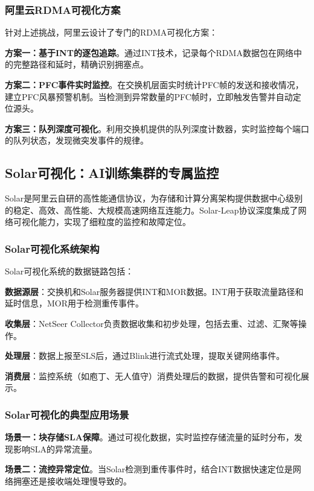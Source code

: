 \subsubsection{阿里云RDMA可视化方案}

针对上述挑战，阿里云设计了专门的RDMA可视化方案：

\textbf{方案一：基于INT的逐包追踪}。通过INT技术，记录每个RDMA数据包在网络中的完整路径和延时，精确识别拥塞点。

\textbf{方案二：PFC事件实时监控}。在交换机层面实时统计PFC帧的发送和接收情况，建立PFC风暴预警机制。当检测到异常数量的PFC帧时，立即触发告警并自动定位源头。

\textbf{方案三：队列深度可视化}。利用交换机提供的队列深度计数器，实时监控每个端口的队列状态，发现微突发事件的规律。

\subsection{Solar可视化：AI训练集群的专属监控}

Solar是阿里云自研的高性能通信协议，为存储和计算分离架构提供数据中心级别的稳定、高效、高性能、大规模高速网络互连能力。Solar-Leap协议深度集成了网络可视化能力，实现了细粒度的监控和故障定位。

\subsubsection{Solar可视化系统架构}

Solar可视化系统的数据链路包括：

\textbf{数据源层}：交换机和Solar服务器提供INT和MOR数据。INT用于获取流量路径和延时信息，MOR用于检测重传事件。

\textbf{收集层}：NetSeer Collector负责数据收集和初步处理，包括去重、过滤、汇聚等操作。

\textbf{处理层}：数据上报至SLS后，通过Blink进行流式处理，提取关键网络事件。

\textbf{消费层}：监控系统（如庖丁、无人值守）消费处理后的数据，提供告警和可视化展示。

\subsubsection{Solar可视化的典型应用场景}

\textbf{场景一：块存储SLA保障}。通过可视化数据，实时监控存储流量的延时分布，发现影响SLA的异常流量。

\textbf{场景二：流控异常定位}。当Solar检测到重传事件时，结合INT数据快速定位是网络拥塞还是接收端处理慢导致的。

